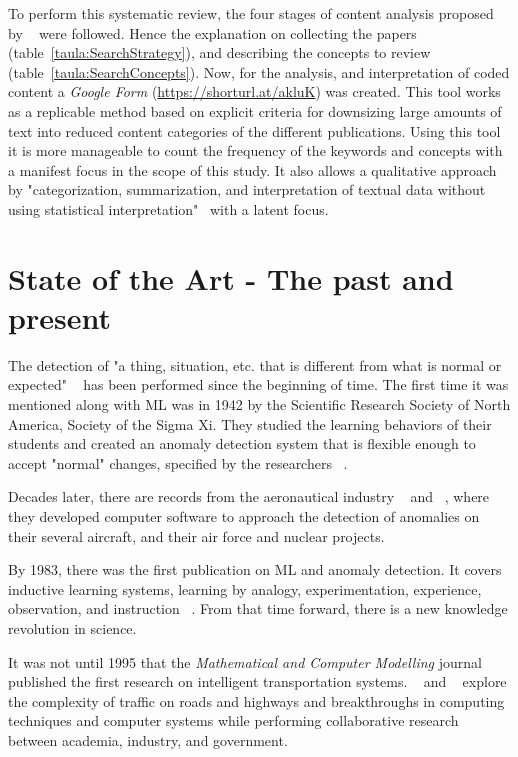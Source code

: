 \documentclass[a4paper,12pt,twoside]{ThesisStyle}
\begin{document}
To perform this systematic review, the four stages of content analysis proposed by ~\cite{gaur2018systematic} were followed. Hence the explanation on collecting the papers (table~\ref{taula:SearchStrategy}), and  describing the concepts to review (table~\ref{taula:SearchConcepts}). Now, for the analysis, and interpretation of coded content a \textit{Google Form} (\url{https://shorturl.at/akluK}) was created. This tool works as a replicable method based on explicit criteria for downsizing large amounts of text into reduced content categories of the different publications. Using this tool it is more manageable to count the frequency of the keywords and concepts with a manifest focus in the scope of this study. It also allows a qualitative approach by "categorization, summarization, and interpretation of textual data without using statistical interpretation"~\cite{stemler2000overview} with a latent focus.



\chapter{State of the Art - The past and present}
\label{cap:estat}

The detection of "a thing, situation, etc. that is different from what is normal or expected" ~\cite{anomalyOxford} has been performed since the beginning of time. The first time it was mentioned along with ML was in 1942 by the Scientific Research Society of North America, Society of the Sigma Xi. They studied the learning behaviors of their students and created an anomaly detection system that is flexible enough to accept "normal" changes, specified by the researchers ~\cite{Scientist1942}.

Decades later, there are records from the aeronautical industry ~\cite{Nuclear1958} and ~\cite{Aerospace1966}, where they developed computer software to approach the detection of anomalies on their several aircraft, and their air force and nuclear projects.

By 1983, there was the first publication on ML and anomaly detection. It covers inductive learning systems, learning by analogy, experimentation, experience, observation, and instruction ~\cite{anderson1983machine}. From that time forward, there is a new knowledge revolution in science.

It was not until 1995 that the \textit{Mathematical and Computer Modelling} journal published the first research on intelligent transportation systems. ~\cite{AMIN19951} and ~\cite{GARCIAORTIZ199511} explore the complexity of traffic on roads and highways and breakthroughs in computing techniques and computer systems while performing collaborative research between academia, industry, and government. 
\end{document}
